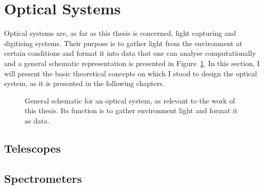 
\section{Optical Systems}%
\label{sec:theobg_opticalsystems}

Optical systems are, as far as this thesis is concerned, light capturing
and digitising systems. Their purpose is to gather light from the
environment at certain conditions and format it into data that one can
analyse computationally and a general schematic representation is
presented in Figure~\ref{fig:theobg_opticalsystems_generalschematic}.
In this section, I will present the basic theoretical concepts on which
I stood to design the optical system, as it is presented in the
following chapters. 

\begin{figure}[htpb]
    \centering
    \missingfigure{}
    \caption{General schematic for an optical system, as relevant to the
    work of this thesis. Its function is to gather environment light and
    format it as data.}%
    \label{fig:theobg_opticalsystems_generalschematic}
\end{figure}

\subsection{Telescopes}%
\label{sub:theobg_opticalsystems_telescopes}


\subsection{Spectrometers}%
\label{sub:theobg_opticalsystems_spectrometers}





